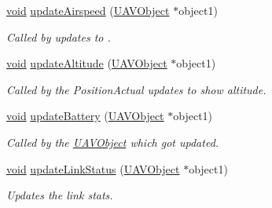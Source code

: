 \begin{DoxyCompactItemize}
\hyperlink{group___u_a_v_objects_plugin_ga444cf2ff3f0ecbe028adce838d373f5c}{void} \hyperlink{group___o_p_map_plugin_gac2bff4b3471fe9c088578d0d274716c6}{update\-Airspeed} (\hyperlink{class_u_a_v_object}{\-U\-A\-V\-Object} $\ast$object1)
\begin{DoxyCompactList}\small\item\em \-Called by updates to . \end{DoxyCompactList}\item 
\hyperlink{group___u_a_v_objects_plugin_ga444cf2ff3f0ecbe028adce838d373f5c}{void} \hyperlink{group___o_p_map_plugin_ga2502b994bd991dec300fec210a41d06c}{update\-Altitude} (\hyperlink{class_u_a_v_object}{\-U\-A\-V\-Object} $\ast$object1)
\begin{DoxyCompactList}\small\item\em \-Called by the \-Position\-Actual updates to show altitude. \end{DoxyCompactList}\item 
\hyperlink{group___u_a_v_objects_plugin_ga444cf2ff3f0ecbe028adce838d373f5c}{void} \hyperlink{group___o_p_map_plugin_ga098f60a9fd8da31477dcba4496d0f322}{update\-Battery} (\hyperlink{class_u_a_v_object}{\-U\-A\-V\-Object} $\ast$object1)
\begin{DoxyCompactList}\small\item\em \-Called by the \hyperlink{class_u_a_v_object}{\-U\-A\-V\-Object} which got updated. \end{DoxyCompactList}\item 
\hyperlink{group___u_a_v_objects_plugin_ga444cf2ff3f0ecbe028adce838d373f5c}{void} \hyperlink{group___o_p_map_plugin_ga2ac4d982767aaefdeb40a4b506c57497}{update\-Link\-Status} (\hyperlink{class_u_a_v_object}{\-U\-A\-V\-Object} $\ast$object1)
\begin{DoxyCompactList}\small\item\em \-Updates the link stats. \end{DoxyCompactList}\end{DoxyCompactItemize}
